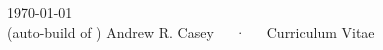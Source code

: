 \documentclass[11pt, a4paper]{awesome-cv}
\begin{document}
\makecvheader

\makecvfooter
  {\today\\(auto-build \href{https://github.com/andycasey/cv/commit/\githash}{\githash} of \giturl)}
  {Andrew R. Casey~~~·~~~Curriculum Vitae}
  {\thepage}






\clearpage



\clearpage



\clearpage



\end{document}
